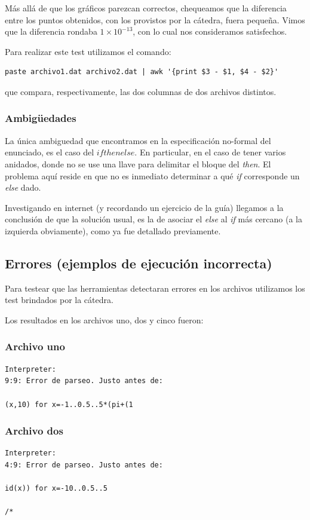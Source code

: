 M\'as all\'a de que los gr\'aficos parezcan correctos, chequeamos que la diferencia
entre los puntos obtenidos, con los provistos por la c\'atedra, fuera peque\~na.
Vimos que la diferencia rondaba $1{\times}10^{-13}$, con lo cual nos consideramos
satisfechos.

Para realizar este test utilizamos el comando:
\begin{verbatim}
paste archivo1.dat archivo2.dat | awk '{print $3 - $1, $4 - $2}'
\end{verbatim}
que compara, respectivamente, las dos columnas de dos archivos distintos.

\subsubsection{Ambig\"uedades}
La \'unica ambiguedad que encontramos en la especificaci\'on no-formal del
enunciado, es el caso del $if then else$. En particular, en el caso de tener
varios anidados, donde no se use una llave para delimitar el bloque del
\textit{then}. El problema aqu\'i reside en que no es inmediato determinar
a qu\'e \textit{if} corresponde un \textit{else} dado.

Investigando en internet (y recordando un ejercicio de la gu\'ia) llegamos
a la conclusi\'on de que la soluci\'on usual, es la de asociar el \textit{else}
al \textit{if} m\'as cercano (a la izquierda obviamente), como ya fue detallado
previamente.

\subsection{Errores (ejemplos de ejecuci\'on incorrecta)}

Para testear que las herramientas detectaran errores en los archivos 
utilizamos los test brindados por la c\'atedra.

Los resultados en los archivos uno, dos y cinco fueron: 
\subsubsection{Archivo uno}
\begin{verbatim}
Interpreter: 
9:9: Error de parseo. Justo antes de:

(x,10) for x=-1..0.5..5*(pi+(1
\end{verbatim}

\subsubsection{Archivo dos}
\begin{verbatim}
Interpreter: 
4:9: Error de parseo. Justo antes de:

id(x)) for x=-10..0.5..5

/*
\end{verbatim}

